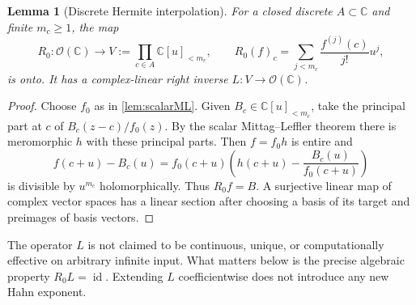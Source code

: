 \documentclass[11pt,letterpaper]{article}
\newtheorem{lemma}[theorem]{Lemma}
\theoremstyle{definition}
\theoremstyle{remark}
\newcommand{\C}{\mathbb C}
\newcommand{\OO}{\mathcal O}
\newcommand{\id}{\operatorname{id}}
\numberwithin{equation}{section}
\begin{document}
\begin{lemma}[Discrete Hermite interpolation]\label{lem:hermite}
For a closed discrete $A\subset\C$ and finite $m_c\ge1$, the map
\begin{equation}\label{eq:scalarjets}
 R_0:\OO(\C)\longrightarrow
 V:=\prod_{c\in A}\C[u]_{<m_c},\qquad
 R_0(f)_c=\sum_{j<m_c}\frac{f^{(j)}(c)}{j!}u^j,
\end{equation}
is onto. It has a complex-linear right inverse $L:V\to\OO(\C)$.
\end{lemma}
\begin{proof}
Choose $f_0$ as in \cref{lem:scalarML}. Given $B_c\in\C[u]_{<m_c}$, take the principal part at $c$ of $B_c(z-c)/f_0(z)$. By the scalar Mittag--Leffler theorem there is meromorphic $h$ with these principal parts. Then $f=f_0h$ is entire and
\[
 f(c+u)-B_c(u)
 =f_0(c+u)\left(h(c+u)-\frac{B_c(u)}{f_0(c+u)}\right)
\]
is divisible by $u^{m_c}$ holomorphically. Thus $R_0f=B$. A surjective linear map of complex vector spaces has a linear section after choosing a basis of its target and preimages of basis vectors.
\end{proof}
The operator $L$ is not claimed to be continuous, unique, or computationally effective on arbitrary infinite input. What matters below is the precise algebraic property $R_0L=\id$. Extending $L$ coefficientwise does not introduce any new Hahn exponent.
\end{document}
